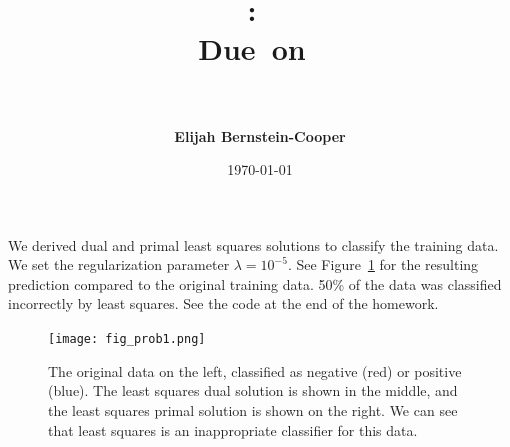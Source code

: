 \documentclass{article}
\title{\vspace{0in}
    \textmd{\textbf{\hmwkClass:\ \hmwkTitle}}\\
    \normalsize\vspace{0.1in}\small{Due\ on\ \hmwkDueDate}\\
    \vspace{0.1in}\large{\textit{\hmwkClassInstructor\ \hmwkClassTime}}
    \vspace{0.5in}}
\author{\textbf{Elijah Bernstein-Cooper}}
\date{\today} %
\begin{document}
\maketitle

\begin{homeworkProblem}

    We derived dual and primal least squares solutions to classify the training
    data. We set the regularization parameter $\lambda = 10^{-5}$. See
    Figure~\ref{fig:prob1} for the resulting prediction compared to the
    original training data. 50\% of the data was classified incorrectly by
    least squares. See the code at the end of the homework.
    
    \begin{figure}[!ht]
        \begin{centering}
        \texttt{[image: fig\_prob1.png]}

        \caption{\label{fig:prob1} The original data on the left, classified as
            negative (red) or positive (blue). The least squares dual solution
            is shown in the middle, and the least squares primal solution is
            shown on the right. We can see that least squares is an
            inappropriate classifier for this data.}
        \end{centering}

    \end{figure} 

\end{homeworkProblem}
\clearpage
\end{document}
